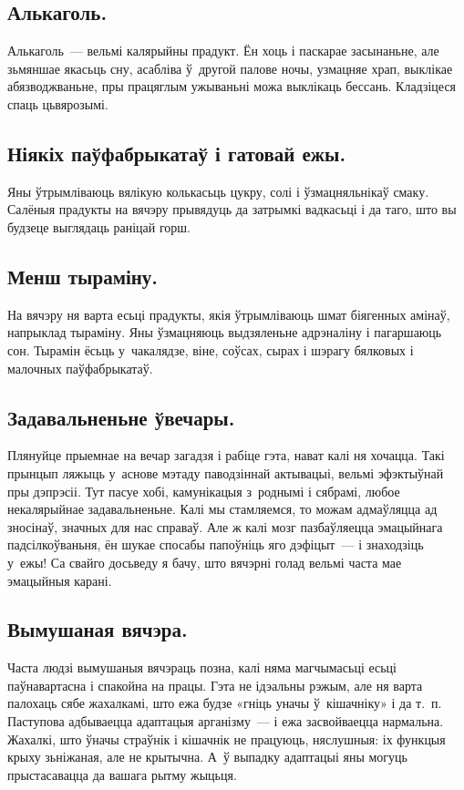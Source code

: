 
\subsection{Алькаголь.}
Алькаголь~--- вельмі калярыйны прадукт. Ён хоць і паскарае засынаньне, але зьмяншае якасьць сну, асабліва ў~другой палове ночы, узмацняе храп, выклікае абязводжваньне, пры працяглым ужываньні можа выклікаць бессань. Кладзіцеся спаць цьвярозымі.

\subsection{Ніякіх паўфабрыкатаў і гатовай ежы.}
Яны ўтрымліваюць вялікую колькасьць цукру, солі і ўзмацняльнікаў смаку. Салёныя прадукты на вячэру прывядуць да затрымкі вадкасьці і да таго, што вы будзеце выглядаць раніцай горш.

\subsection{Менш тыраміну.}
На вячэру ня варта есьці прадукты, якія ўтрымліваюць шмат біягенных амінаў, напрыклад тыраміну. Яны ўзмацняюць выдзяленьне адрэналіну і пагаршаюць сон. Тырамін ёсьць у~чакалядзе, віне, соўсах, сырах і шэрагу бялковых і малочных паўфабрыкатаў.

\subsection{Задавальненьне ўвечары.}
Плянуйце прыемнае на вечар загадзя і рабіце гэта, нават калі ня хочацца. Такі прынцып ляжыць у~аснове мэтаду паводзіннай актывацыі, вельмі эфэктыўнай пры дэпрэсіі. Тут пасуе хобі, камунікацыя з~роднымі і сябрамі, любое некалярыйнае задавальненьне. Калі мы стамляемся, то можам адмаўляцца ад зносінаў, значных для нас справаў. Але ж калі мозг пазбаўляецца эмацыйнага падсілкоўваньня, ён шукае спосабы папоўніць яго дэфіцыт~--- і знаходзіць у~ежы! Са свайго досьведу я бачу, што вячэрні голад вельмі часта мае эмацыйныя карані.

\subsection{Вымушаная вячэра.}
Часта людзі вымушаныя вячэраць позна, калі няма магчымасьці есьці паўнавартасна і спакойна на працы. Гэта не ідэальны рэжым, але ня варта палохаць сябе жахалкамі, што ежа будзе «гніць уначы ў~кішачніку» і да т.~п. Паступова адбываецца адаптацыя арганізму~--- і ежа засвойваецца нармальна. Жахалкі, што ўначы страўнік і кішачнік не працуюць, няслушныя: іх функцыя крыху зьніжаная, але не крытычна. А~ў выпадку адаптацыі яны могуць прыстасавацца да вашага рытму жыцьця.